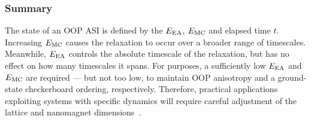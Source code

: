 \subsubsection{Summary}
The state of an OOP ASI is defined by the  $E_\mathrm{EA}$,  $E_\mathrm{MC}$ and elapsed time $t$.
Increasing $E_\mathrm{MC}$ causes the relaxation to occur over a broader range of timescales.
Meanwhile, $E_\mathrm{EA}$ controls the absolute timescale of the relaxation, but has no effect on how many timescales it spans.
For  purposes, a sufficiently low $E_\mathrm{EA}$ and $E_\mathrm{MC}$ are required --- but not too low, to maintain OOP anisotropy and a ground-state checkerboard ordering, respectively.
Therefore, practical applications exploiting systems with specific dynamics will require careful adjustment of the lattice and nanomagnet dimensions~\cite{KUR-24}.

